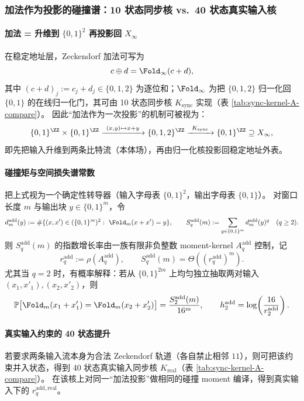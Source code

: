 \subsubsection{加法作为投影的碰撞谱：10 状态同步核 vs.\ 40 状态真实输入核}\label{app:add-collision-spectrum}

\paragraph{加法 = 升维到 \texorpdfstring{$\{0,1\}^2$}{\{0,1\}^2} 再投影回 \texorpdfstring{$X_\infty$}{X\_infty}}
在稳定地址层，Zeckendorf 加法可写为
\[
c\oplus d=\Fold_\infty(c+d),
\]
其中 \((c+d)_j:=c_j+d_j\in\{0,1,2\}\) 为逐位和；\(\Fold_\infty\) 为把 \(\{0,1,2\}\) 归一化回 \(\{0,1\}\) 的在线归一化门，其可由 10 状态同步核 \(K_{\mathrm{sync}}\) 实现（表 \ref{tab:sync-kernel-A-compare}）。
因此“加法作为一次投影”的机制可被视为：
\[
\{0,1\}^{\ZZ}\times\{0,1\}^{\ZZ}\xrightarrow{\ (x,y)\mapsto x+y\ }\{0,1,2\}^{\ZZ}\xrightarrow{\ K_{\mathrm{sync}}\ }\{0,1\}^{\ZZ}\supseteq X_\infty,
\]
即先把输入升维到两条比特流（本体场），再由归一化核投影回稳定地址外表。

\paragraph{碰撞矩与空间损失谱常数}
把上式视为一个确定性转导器（输入字母表 \(\{0,1\}^2\)，输出字母表 \(\{0,1\}\)）。
对窗口长度 \(m\) 与输出块 \(y\in\{0,1\}^m\)，令
\[
d^{\mathrm{add}}_m(y):=\#\{(x,x')\in(\{0,1\}^m)^2:\ \Fold_m(x+x')=y\},
\qquad
S^{\mathrm{add}}_q(m):=\sum_{y\in\{0,1\}^m}d^{\mathrm{add}}_m(y)^q\quad(q\ge 2).
\]
则 \(S^{\mathrm{add}}_q(m)\) 的指数增长率由一族有限非负整数 moment-kernel \(A^{\mathrm{add}}_q\) 控制，记
\[
r^{\mathrm{add}}_q:=\rho\!\left(A^{\mathrm{add}}_q\right),
\qquad
S^{\mathrm{add}}_q(m)=\Theta\!\left((r^{\mathrm{add}}_q)^m\right).
\]
尤其当 \(q=2\) 时，有概率解释：若从 \(\{0,1\}^{2m}\) 上均匀独立抽取两对输入 \((x_1,x'_1),(x_2,x'_2)\)，则
\[
\mathbb{P}\bigl[\Fold_m(x_1+x'_1)=\Fold_m(x_2+x'_2)\bigr]=\frac{S^{\mathrm{add}}_2(m)}{16^m},
\qquad
h^{\mathrm{add}}_2=\log\!\left(\frac{16}{r^{\mathrm{add}}_2}\right).
\]

\paragraph{真实输入约束的 40 状态提升}
若要求两条输入流本身为合法 Zeckendorf 轨道（各自禁止相邻 \(11\)），则可把该约束并入状态，得到 40 状态真实输入同步核 \(K_{\mathrm{real}}\)（表 \ref{tab:sync-kernel-A-compare}）。
在该核上对同一“加法投影”做相同的碰撞 moment 编译，得到真实输入下的 \(r^{\mathrm{add,real}}_q\)。

